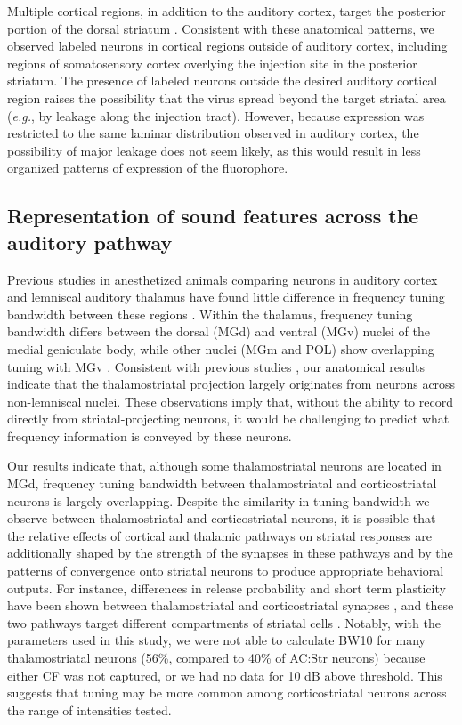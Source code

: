 Multiple cortical regions, in addition to the auditory cortex, target the posterior portion of the dorsal striatum \citep{Hunnicutt2016}.
%
Consistent with these anatomical patterns, we observed labeled neurons in cortical regions outside of auditory cortex, including regions of somatosensory cortex overlying the injection site in the posterior striatum.
%
The presence of labeled neurons outside the desired auditory cortical region raises the possibility that the virus spread beyond the target striatal area (\emph{e.g.}, by leakage along the injection tract). However, because expression was restricted to the same laminar distribution observed in auditory cortex, the possibility of major leakage does not seem likely, as this would result in less organized patterns of expression of the fluorophore.

\subsection{Representation of sound features across the auditory pathway}
%
Previous studies in anesthetized animals comparing neurons in auditory cortex and lemniscal auditory thalamus have found little difference in frequency tuning bandwidth between these regions \citep{Miller2002}. 
%
Within the thalamus, frequency tuning bandwidth differs between the dorsal (MGd) and ventral (MGv) nuclei of the medial geniculate body, while other nuclei (MGm and POL) show overlapping tuning with MGv \citep{Anderson2011}.
%
Consistent with previous studies \citep{Doron1999}, our anatomical results indicate that the thalamostriatal projection largely originates from neurons across non-lemniscal nuclei. 
%
These observations imply that, without the ability to record directly from striatal-projecting neurons, it would be challenging to predict what frequency information is conveyed by these neurons. 
%

Our results indicate that, although some thalamostriatal neurons are located in MGd, frequency tuning bandwidth between thalamostriatal and corticostriatal neurons is largely overlapping. 
%
Despite the similarity in tuning bandwidth we observe between thalamostriatal and corticostriatal neurons, it is possible that the relative effects of cortical and thalamic pathways on striatal responses are additionally shaped by the strength of the synapses in these pathways and by the patterns of convergence onto striatal neurons to produce appropriate behavioral outputs. 
%
For instance, differences in release probability and short term plasticity have been shown between thalamostriatal and corticostriatal synapses \citep{Ding2008}, and these two pathways target different compartments of striatal cells \citep{Smith2004}. 
%
Notably, with the parameters used in this study, we were not able to calculate BW10 for many thalamostriatal neurons (56\%, compared to 40\% of AC:Str neurons) because either CF was not captured, or we had no data for 10 dB above threshold. This suggests that tuning may be more common among corticostriatal neurons across the range of intensities tested.
 
